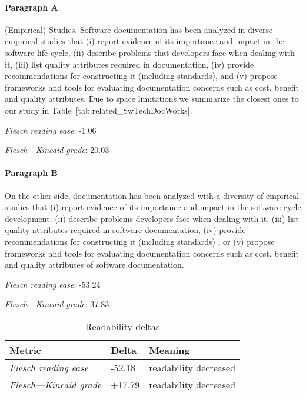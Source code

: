 \paragraph{Paragraph A}
(Empirical) Studies. Software documentation has been analyzed in diverse empirical studies that (i) report evidence of its importance and impact in the software life cycle, (ii) describe problems that developers face when dealing with it, (iii) list quality attributes required in documentation, (iv) provide recommendations for constructing it (including standards), and (v) propose frameworks and tools for evaluating documentation concerns such as cost, benefit and quality attributes. Due to space limitations we summarize the closest ones to our study in Table [tab:related\_SwTechDocWorks].\par\medskip
\emph{Flesch reading ease}: -1.06\par
\emph{Flesch---Kincaid grade}: 20.03

\paragraph{Paragraph B}
On the other side, documentation has been analyzed with a diversity of empirical studies that (i) report evidence of its importance and impact in the software cycle development, (ii) describe problems developers face when dealing with it, (iii) list quality attributes required in software documentation, (iv) provide recommendations for constructing it (including standards) , or (v) propose frameworks and tools for evaluating documentation concerns such as cost, benefit and quality attributes of software documentation.\par\medskip
\emph{Flesch reading ease}: -53.24\par
\emph{Flesch---Kincaid grade}: 37.83

\bigskip\begin{table}[!h]
\centering
\begin{tabular}{lll}
\toprule
               \textbf{Metric} & \textbf{Delta} &       \textbf{Meaning} \\
\midrule
    \emph{Flesch reading ease} &         -52.18 &  readability decreased \\
 \emph{Flesch---Kincaid grade} &         +17.79 &  readability decreased \\
\bottomrule
\end{tabular}
\caption*{Readability deltas}\end{table}

